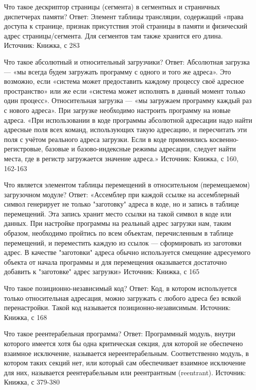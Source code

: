 \documentclass[russian,twocolumn]{article}
\begin{document}
Что такое дескриптор страницы (сегмента) в сегментных и страничных диспетчерах памяти?
Ответ: 
Элемент таблицы трансляции, содержащий «права доступа к странице, признак присутствия этой страницы в памяти и физический адрес страницы/сегмента. Для сегментов там также хранится его длина. 
Источник: 
Книжка, с 283 

Что такое абсолютный и относительный загрузчики?
Ответ: 
Абсолютная загрузка — «мы всегда будем загружать программу с одного и того же адреса». Это возможно, если «система может предоставить каждому процессу своё адресное пространство» или же если «система может исполнять в данный момент только один процесс». 
Относительная загрузка — «мы загружаем программу каждый раз с нового адреса». При загрузке необходимо настроить программу на новые адреса. «При использовании в коде программы абсолютной адресации надо найти адресные поля всех команд, использующих такую адресацию, и пересчитать эти поля с учётом реального адреса загрузки. Если в коде применялись косвенно-регистровые, базовые и базово-индексные режимы адресации, следует найти места, где в регистр загружается значение адреса.» 
Источник: 
Книжка, с 160, 162-163 

Что является элементом таблицы перемещений в относительном (перемещаемом) загрузочном модуле?
Ответ: 
«Ассемблер при каждой ссылке на ассемблерный символ генерирует не только "заготовку" адреса в коде, но и запись в таблице перемещений. Эта запись хранит место ссылки на такой символ в коде или данных. При настройке программы на реальный адрес загрузки нам, таким образом, необходимо пройтись по всем объектам, перечисленным в таблице перемещений, и переместить каждую из ссылок — сформировать из заготовки адрес. В качестве "заготовки" адреса обычно используется смещение адресуемого объекта от начала программы и для перемещения оказывается достаточно добавить к "заготовке" адрес загрузки» 
Источник: 
Книжка, с 165 

Что такое позиционно-независимый код?
Ответ: 
Код, в котором используется только относительная адресация, можно загружать с любого адреса без всякой перенастройки. Такой код называется позиционно-независимым. 
Источник: 
Книжка, с 168 

Что такое реентерабельная программа?
Ответ: 
Программный модуль, внутри которого имеется хотя бы одна критическая секция, для которой не обеспечено взаимное исключение, называется нереентерабельным. Соответственно модуль, в котором таких секций нет, или который сам обеспечивает взаимное исключение для них, называется реентерабельным или реентрантным (reentrant). 
Источник: 
Книжка, с 379-380 
\end{document}
